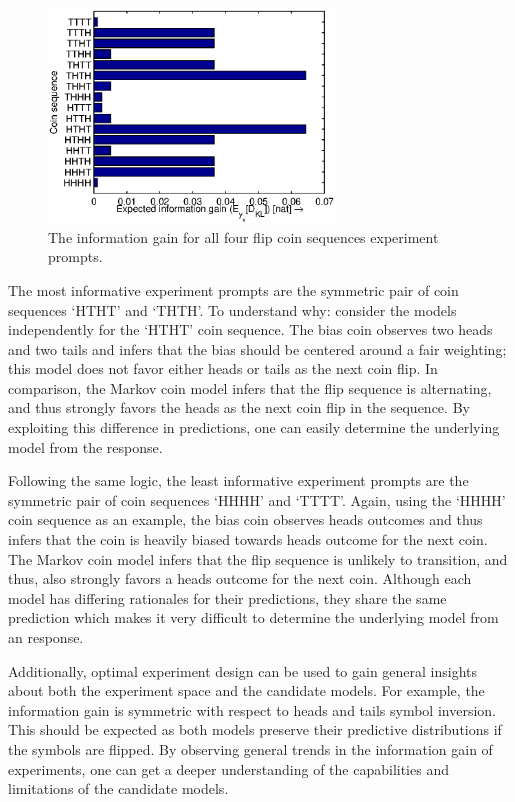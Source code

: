 \documentclass{article}
\begin{document}
\begin{figure}[h!]
\centering
\includegraphics[width=3in]{img/coin.eps}
\caption{The information gain for all four flip coin sequences experiment prompts.}
\label{fig:coin}
\end{figure}

The most informative experiment prompts are the symmetric pair of coin sequences `HTHT' and `THTH'. To understand why: consider the models independently for the `HTHT' coin sequence. The bias coin observes two heads and two tails and infers that the bias should be centered around a fair weighting; this model does not favor either heads or tails as the next coin flip. In comparison, the Markov coin model infers that the flip sequence is alternating, and thus strongly favors the heads as the next coin flip in the sequence. By exploiting this difference in predictions, one can easily determine the underlying model from the response.

Following the same logic, the least informative experiment prompts are the symmetric pair of coin sequences `HHHH' and `TTTT'. Again, using the `HHHH' coin sequence as an example, the bias coin observes heads outcomes and thus infers that the coin is heavily biased towards heads outcome for the next coin. The Markov coin model infers that the flip sequence is unlikely to transition, and thus, also strongly favors a heads outcome for the next coin. Although each model has differing rationales for their predictions, they share the same prediction which makes it very difficult to determine the underlying model from an response. 

Additionally, optimal experiment design can be used to gain general insights about both the experiment space and the candidate models. For example, the information gain is symmetric with respect to heads and tails symbol inversion. This should be expected as both models preserve their predictive distributions if the symbols are flipped. By observing general trends in the information gain of experiments, one can get a deeper understanding of the capabilities and limitations of the candidate models.
\end{document}
